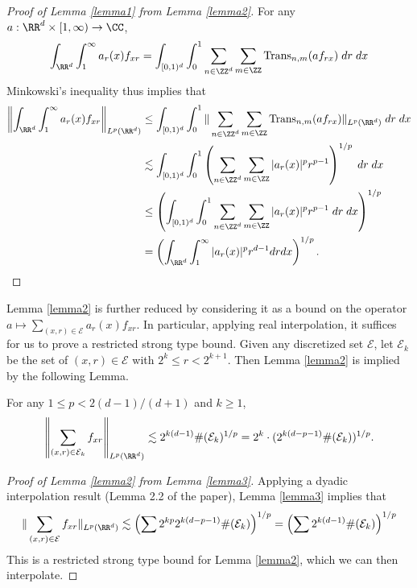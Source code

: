 \begin{proof}[Proof of Lemma \ref{lemma1} from Lemma \ref{lemma2}]
    For any $a: \RR^d \times [1,\infty) \to \CC$,
    \[ \int_{\RR^d} \int_1^\infty a_r(x) f_{x r} = \int_{[0,1)^d} \int_0^1 \sum_{n \in \ZZ^d} \sum_{m \in \ZZ} \text{Trans}_{n,m} (a f_{rx})\; dr\; dx \]
    Minkowski's inequality thus implies that
    \begin{align*}
    \left\| \int_{\RR^d} \int_1^\infty a_r(x) f_{x r} \right\|_{L^p(\RR^d)} &\leq \int_{[0,1)^d} \int_0^1 \| \sum_{n \in \ZZ^d} \sum_{m \in \ZZ} \text{Trans}_{n,m} (a f_{rx}) \|_{L^p(\RR^d)}\; dr\; dx\\
    &\lesssim \int_{[0,1)^d} \int_0^1 \left( \sum_{n \in \ZZ^d} \sum_{m \in \ZZ} |a_r(x)|^p r^{p-1} \right)^{1/p}\; dr\; dx\\
    &\leq \left( \int_{[0,1)^d} \int_0^1 \sum_{n \in \ZZ^d} \sum_{m \in \ZZ} |a_r(x)|^p r^{p-1}\; dr\; dx \right)^{1/p}\\
    &= \left( \int_{\RR^d} \int_1^\infty |a_r(x)|^p r^{d-1} dr dx \right)^{1/p}. \qedhere
    \end{align*}
\end{proof}

Lemma \ref{lemma2} is further reduced by considering it as a bound on the operator $a \mapsto \sum_{(x,r) \in \mathcal{E}} a_r(x) f_{xr}$. In particular, applying real interpolation, it suffices for us to prove a restricted strong type bound. Given any discretized set $\mathcal{E}$, let $\mathcal{E}_k$ be the set of $(x,r) \in \mathcal{E}$ with $2^k \leq r < 2^{k+1}$. Then Lemma \ref{lemma2} is implied by the following Lemma.

\begin{lemma} \label{lemma3}
    For any $1 \leq p < 2(d - 1)/(d+1)$ and $k \geq 1$,
    \[ \left\| \sum_{(x,r) \in \mathcal{E}_k} f_{xr} \right\|_{L^p(\RR^d)} \lesssim 2^{k(d - 1)} \#(\mathcal{E}_k)^{1/p} = 2^k \cdot (2^{k(d-p-1)} \#(\mathcal{E}_k))^{1/p}. \]
\end{lemma}

\begin{proof}[Proof of Lemma \ref{lemma2} from Lemma \ref{lemma3}]
    Applying a dyadic interpolation result (Lemma 2.2 of the paper), Lemma \ref{lemma3} implies that
    \[ \| \sum_{(x,r) \in \mathcal{E}} f_{xr} \|_{L^p(\RR^d)} \lesssim \left( \sum 2^{kp} 2^{k(d-p-1)} \#(\mathcal{E}_k) \right)^{1/p} = \left( \sum 2^{k(d-1)} \#(\mathcal{E}_k) \right)^{1/p} \]
    This is a restricted strong type bound for Lemma \ref{lemma2}, which we can then interpolate.
\end{proof}


